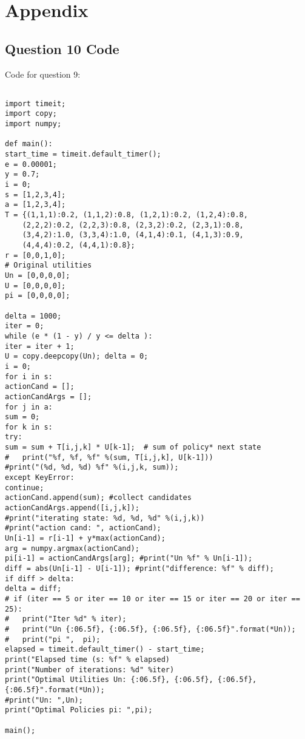 \section{Appendix}
\subsection{Question 10 Code}
Code for question 9:

\begin{verbatim}

import timeit;
import copy;
import numpy;

def main():
start_time = timeit.default_timer();
e = 0.00001;
y = 0.7;
i = 0;
s = [1,2,3,4];
a = [1,2,3,4];
T = {(1,1,1):0.2, (1,1,2):0.8, (1,2,1):0.2, (1,2,4):0.8,
	(2,2,2):0.2, (2,2,3):0.8, (2,3,2):0.2, (2,3,1):0.8,
	(3,4,2):1.0, (3,3,4):1.0, (4,1,4):0.1, (4,1,3):0.9,
	(4,4,4):0.2, (4,4,1):0.8};
r = [0,0,1,0];
# Original utilities
Un = [0,0,0,0];
U = [0,0,0,0];
pi = [0,0,0,0];

delta = 1000;
iter = 0;
while (e * (1 - y) / y <= delta ):
iter = iter + 1;
U = copy.deepcopy(Un); delta = 0;
i = 0;
for i in s:
actionCand = [];
actionCandArgs = [];
for j in a:
sum = 0;
for k in s:
try:
sum = sum + T[i,j,k] * U[k-1];	# sum of policy* next state
#	print("%f, %f, %f" %(sum, T[i,j,k], U[k-1]))
#print("(%d, %d, %d) %f" %(i,j,k, sum));
except KeyError:
continue;
actionCand.append(sum); #collect candidates
actionCandArgs.append([i,j,k]);
#print("iterating state: %d, %d, %d" %(i,j,k))
#print("action cand: ", actionCand);
Un[i-1] = r[i-1] + y*max(actionCand);
arg = numpy.argmax(actionCand);
pi[i-1] = actionCandArgs[arg]; #print("Un %f" % Un[i-1]);
diff = abs(Un[i-1] - U[i-1]); #print("difference: %f" % diff);
if diff > delta:
delta = diff;
# if (iter == 5 or iter == 10 or iter == 15 or iter == 20 or iter == 25):
# 	print("Iter %d" % iter);
# 	print("Un {:06.5f}, {:06.5f}, {:06.5f}, {:06.5f}".format(*Un));
# 	print("pi ",  pi);
elapsed = timeit.default_timer() - start_time;
print("Elapsed time (s: %f" % elapsed)
print("Number of iterations: %d" %iter)
print("Optimal Utilities Un: {:06.5f}, {:06.5f}, {:06.5f}, {:06.5f}".format(*Un));
#print("Un: ",Un);
print("Optimal Policies pi: ",pi);

main();

\end{verbatim}